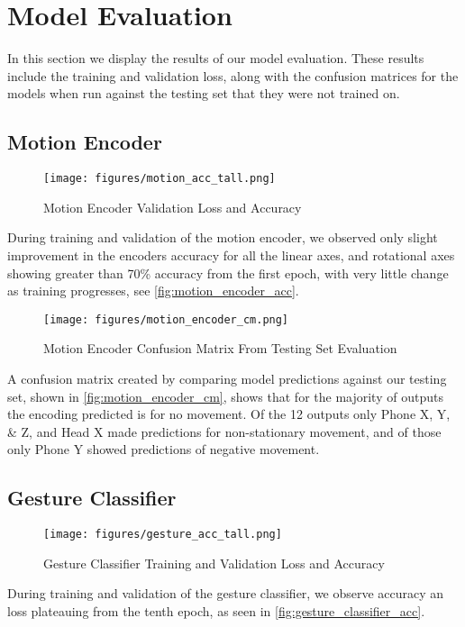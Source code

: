 
\section{Model Evaluation} %
In this section we display the results of our model evaluation.
These results include the training and validation loss, along with the confusion matrices for the models when run against the testing set that they were not trained on.

\subsection{Motion Encoder}
\begin{figure}
    \centering
    \texttt{[image: figures/motion\_acc\_tall.png]}
    \caption{\label{fig:motion_encoder_acc} Motion Encoder Validation Loss and Accuracy}
\end{figure}
During training and validation of the motion encoder, we observed only slight improvement in the encoders accuracy for all the linear axes, and rotational axes showing greater than 70\% accuracy from the first epoch, with very little change as training progresses, see \autoref{fig:motion_encoder_acc}.

\begin{figure}
    \centering
    \texttt{[image: figures/motion\_encoder\_cm.png]}
    \caption{\label{fig:motion_encoder_cm} Motion Encoder Confusion Matrix From Testing Set Evaluation}
\end{figure}
A confusion matrix created by comparing model predictions against our testing set, shown in \autoref{fig:motion_encoder_cm}, shows that for the majority of outputs the encoding predicted is for no movement. Of the 12 outputs only Phone X, Y, \& Z, and Head X made predictions for non-stationary movement, and of those only Phone Y showed predictions of negative movement.

\subsection{Gesture Classifier}
\begin{figure}
    \centering
    \texttt{[image: figures/gesture\_acc\_tall.png]}
    \caption{\label{fig:gesture_classifier_acc} Gesture Classifier Training and Validation Loss and Accuracy}
\end{figure}
During training and validation of the gesture classifier, we observe accuracy an loss plateauing from the tenth epoch, as seen in \autoref{fig:gesture_classifier_acc}.

